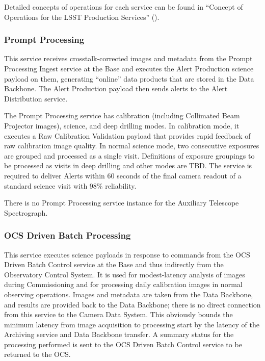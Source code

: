 \documentclass[DM,toc]{lsstdoc}
\begin{document}
Detailed concepts of operations for each service can be found in
``Concept of Operations for the LSST Production Services'' ().

\subsubsection{Prompt Processing}\label{prompt-processing}

This service receives crosstalk-corrected images and metadata from the
Prompt Processing Ingest service at the Base and executes the Alert
Production science payload on them, generating ``online'' data products
that are stored in the Data Backbone. The Alert Production payload then
sends alerts to the Alert Distribution service.

The Prompt Processing service has calibration (including Collimated Beam
Projector images), science, and deep drilling modes. In calibration
mode, it executes a Raw Calibration Validation payload that provides
rapid feedback of raw calibration image quality. In normal science mode,
two consecutive exposures are grouped and processed as a single visit.
Definitions of exposure groupings to be processed as visits in deep
drilling and other modes are TBD. The service is required to deliver
Alerts within 60 seconds of the final camera readout of a standard
science visit with 98\% reliability.

There is no Prompt Processing service instance for the Auxiliary
Telescope Spectrograph.

\subsubsection{OCS Driven Batch
Processing}\label{ocs-driven-batch-processing}

This service executes science payloads in response to commands from the
OCS Driven Batch Control service at the Base and thus indirectly from
the Observatory Control System. It is used for modest-latency analysis
of images during Commissioning and for processing daily calibration
images in normal observing operations. Images and metadata are taken
from the Data Backbone, and results are provided back to the Data
Backbone; there is no direct connection from this service to the Camera
Data System. This obviously bounds the minimum latency from image
acquisition to processing start by the latency of the Archiving service
and Data Backbone transfer. A summary status for the processing
performed is sent to the OCS Driven Batch Control service to be returned
to the OCS.
\end{document}

